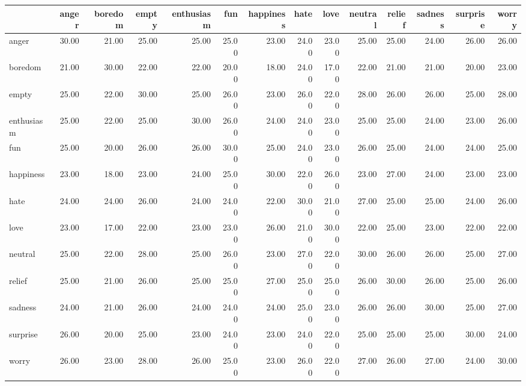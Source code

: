 \begin{tabular}{lrrrrrrrrrrrrr}
\toprule
 & anger & boredom & empty & enthusiasm & fun & happiness & hate & love & neutral & relief & sadness & surprise & worry \\
\midrule
anger & 30.00 & 21.00 & 25.00 & 25.00 & 25.00 & 23.00 & 24.00 & 23.00 & 25.00 & 25.00 & 24.00 & 26.00 & 26.00 \\
boredom & 21.00 & 30.00 & 22.00 & 22.00 & 20.00 & 18.00 & 24.00 & 17.00 & 22.00 & 21.00 & 21.00 & 20.00 & 23.00 \\
empty & 25.00 & 22.00 & 30.00 & 25.00 & 26.00 & 23.00 & 26.00 & 22.00 & 28.00 & 26.00 & 26.00 & 25.00 & 28.00 \\
enthusiasm & 25.00 & 22.00 & 25.00 & 30.00 & 26.00 & 24.00 & 24.00 & 23.00 & 25.00 & 25.00 & 24.00 & 23.00 & 26.00 \\
fun & 25.00 & 20.00 & 26.00 & 26.00 & 30.00 & 25.00 & 24.00 & 23.00 & 26.00 & 25.00 & 24.00 & 24.00 & 25.00 \\
happiness & 23.00 & 18.00 & 23.00 & 24.00 & 25.00 & 30.00 & 22.00 & 26.00 & 23.00 & 27.00 & 24.00 & 23.00 & 23.00 \\
hate & 24.00 & 24.00 & 26.00 & 24.00 & 24.00 & 22.00 & 30.00 & 21.00 & 27.00 & 25.00 & 25.00 & 24.00 & 26.00 \\
love & 23.00 & 17.00 & 22.00 & 23.00 & 23.00 & 26.00 & 21.00 & 30.00 & 22.00 & 25.00 & 23.00 & 22.00 & 22.00 \\
neutral & 25.00 & 22.00 & 28.00 & 25.00 & 26.00 & 23.00 & 27.00 & 22.00 & 30.00 & 26.00 & 26.00 & 25.00 & 27.00 \\
relief & 25.00 & 21.00 & 26.00 & 25.00 & 25.00 & 27.00 & 25.00 & 25.00 & 26.00 & 30.00 & 26.00 & 25.00 & 26.00 \\
sadness & 24.00 & 21.00 & 26.00 & 24.00 & 24.00 & 24.00 & 25.00 & 23.00 & 26.00 & 26.00 & 30.00 & 25.00 & 27.00 \\
surprise & 26.00 & 20.00 & 25.00 & 23.00 & 24.00 & 23.00 & 24.00 & 22.00 & 25.00 & 25.00 & 25.00 & 30.00 & 24.00 \\
worry & 26.00 & 23.00 & 28.00 & 26.00 & 25.00 & 23.00 & 26.00 & 22.00 & 27.00 & 26.00 & 27.00 & 24.00 & 30.00 \\
\bottomrule
\end{tabular}
